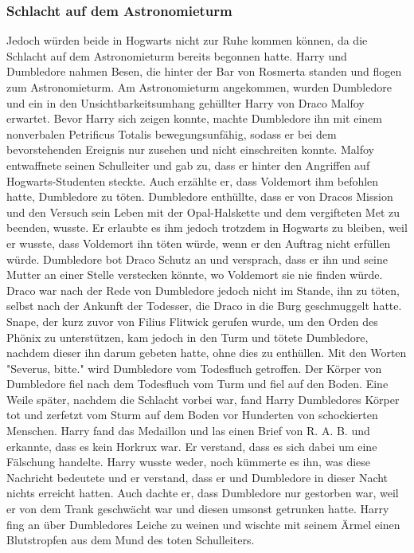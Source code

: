 \documentclass[a4paper, 10pt]{article}
\begin{document}
\subsubsection*{Schlacht auf dem Astronomieturm}
Jedoch würden beide in Hogwarts nicht zur Ruhe kommen können, da die Schlacht auf dem Astronomieturm bereits begonnen hatte. Harry und Dumbledore nahmen Besen, die hinter der Bar von Rosmerta standen und flogen zum Astronomieturm. Am Astronomieturm angekommen, wurden Dumbledore und ein in den Unsichtbarkeitsumhang gehüllter Harry von Draco Malfoy erwartet. Bevor Harry sich zeigen konnte, machte Dumbledore ihn mit einem nonverbalen Petrificus Totalis bewegungsunfähig, sodass er bei dem bevorstehenden Ereignis nur zusehen und nicht einschreiten konnte.
\vspace{10pt}
\newline
Malfoy entwaffnete seinen Schulleiter und gab zu, dass er hinter den Angriffen auf Hogwarts-Studenten steckte. Auch erzählte er, dass Voldemort ihm befohlen hatte, Dumbledore zu töten. Dumbledore enthüllte, dass er von Dracos Mission und den Versuch sein Leben mit der Opal-Halskette und dem vergifteten Met zu beenden, wusste. Er erlaubte es ihm jedoch trotzdem in Hogwarts zu bleiben, weil er wusste, dass Voldemort ihn töten würde, wenn er den Auftrag nicht erfüllen würde. Dumbledore bot Draco Schutz an und versprach, dass er ihn und seine Mutter an einer Stelle verstecken könnte, wo Voldemort sie nie finden würde. Draco war nach der Rede von Dumbledore jedoch nicht im Stande, ihn zu töten, selbst nach der Ankunft der Todesser, die Draco in die Burg geschmuggelt hatte.
\vspace{10pt}
\newline
Snape, der kurz zuvor von Filius Flitwick gerufen wurde, um den Orden des Phönix zu unterstützen, kam jedoch in den Turm und tötete Dumbledore, nachdem dieser ihn darum gebeten hatte, ohne dies zu enthüllen. Mit den Worten "Severus, bitte." wird Dumbledore vom Todesfluch getroffen. Der Körper von Dumbledore fiel nach dem Todesfluch vom Turm und fiel auf den Boden.
\vspace{10pt}
\newline
Eine Weile später, nachdem die Schlacht vorbei war, fand Harry Dumbledores Körper tot und zerfetzt vom Sturm auf dem Boden vor Hunderten von schockierten Menschen. Harry fand das Medaillon und las einen Brief von R. A. B. und erkannte, dass es kein Horkrux war. Er verstand, dass es sich dabei um eine Fälschung handelte. Harry wusste weder, noch kümmerte es ihn, was diese Nachricht bedeutete und er verstand, dass er und Dumbledore in dieser Nacht nichts erreicht hatten. Auch dachte er, dass Dumbledore nur gestorben war, weil er von dem Trank geschwächt war und diesen umsonst getrunken hatte. Harry fing an über Dumbledores Leiche zu weinen und wischte mit seinem Ärmel einen Blutstropfen aus dem Mund des toten Schulleiters.
\end{document}
